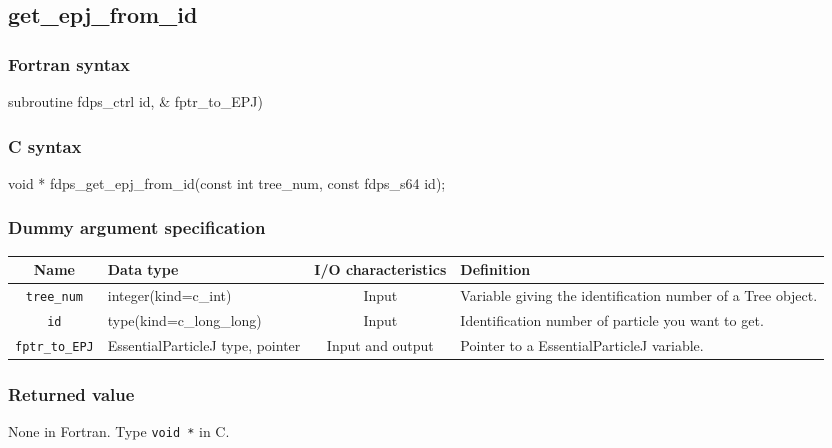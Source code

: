 \subsection{get\_epj\_from\_id}
\subsubsection*{Fortran syntax}
\begin{screen}
\begin{spverbatim}
subroutine fdps_ctrl%
                                     id,       &
                                     fptr_to_EPJ)
\end{spverbatim}
\end{screen}

\subsubsection*{C syntax}
\begin{screen}
\begin{spverbatim}
void * fdps_get_epj_from_id(const int tree_num,
                            const fdps_s64 id);
\end{spverbatim}
\end{screen}


\subsubsection*{Dummy argument specification}
\begin{table}[h]
\begin{tabularx}{\linewidth}{cXcX}
\toprule
\rowcolor{Snow2}
Name & Data type & I/O characteristics & Definition \\
\midrule
\verb|tree_num|  & integer(kind=c\_int)   & Input     & Variable giving the identification number of a Tree object.\\
\verb|id|  & type(kind=c\_long\_long)   & Input     & Identification number of particle you want to get.\\
\verb|fptr_to_EPJ|  & EssentialParticleJ type, \newline pointer   & Input and output     & Pointer to a EssentialParticleJ variable.\\
\bottomrule
\end{tabularx}
\end{table}


\subsubsection*{Returned value}
None in Fortran. Type \verb|void *| in C.


